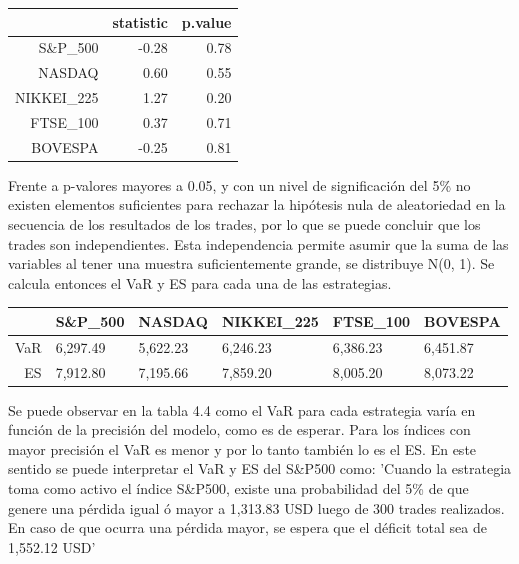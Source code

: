 \documentclass[a4paper,12pt]{Latex/Classes/PhDthesisPSnPDF}
\begin{document}
 
\begin{center}
\begin{table}[ht]
\centering
\begin{tabular}{rrr}
  \hline
 & statistic & p.value \\ 
  \hline
S\&P\_500 & -0.28 & 0.78 \\ 
  NASDAQ & 0.60 & 0.55 \\ 
  NIKKEI\_225 & 1.27 & 0.20 \\ 
  FTSE\_100 & 0.37 & 0.71 \\ 
  BOVESPA & -0.25 & 0.81 \\ 
   \hline
\end{tabular}
\end{table}\end{center}

Frente a p-valores mayores a 0.05, y con un nivel de significación del 5\% no existen elementos suficientes para rechazar la hipótesis nula de aleatoriedad en la secuencia de los resultados de los trades, por lo que se puede concluir que los trades son independientes. Esta independencia permite asumir que la suma de las variables al tener una muestra suficientemente grande, se distribuye N(0, 1). Se calcula entonces el VaR y ES para cada una de las estrategias.


\begin{center}
\begin{table}[ht]
\centering
\begin{tabular}{rlllll}
  \hline
 & S\&P\_500 & NASDAQ & NIKKEI\_225 & FTSE\_100 & BOVESPA \\ 
  \hline
VaR & 6,297.49 & 5,622.23 & 6,246.23 & 6,386.23 & 6,451.87 \\ 
  ES & 7,912.80 & 7,195.66 & 7,859.20 & 8,005.20 & 8,073.22 \\ 
   \hline
\end{tabular}
\end{table}\end{center}
  
Se puede observar en la tabla 4.4 como el VaR para cada estrategia varía en función de la precisión del modelo, como es de esperar. Para los índices con mayor precisión el VaR es menor y por lo tanto también lo es el ES. En este sentido se puede interpretar el VaR y ES del S\&P500 como: 'Cuando la estrategia toma como activo el índice S\&P500, existe una probabilidad del 5\% de que genere una pérdida igual ó mayor a 1,313.83 USD luego de 300 trades realizados. En caso de que ocurra una pérdida mayor, se espera que el déficit total sea de 1,552.12 USD'
\end{document}
